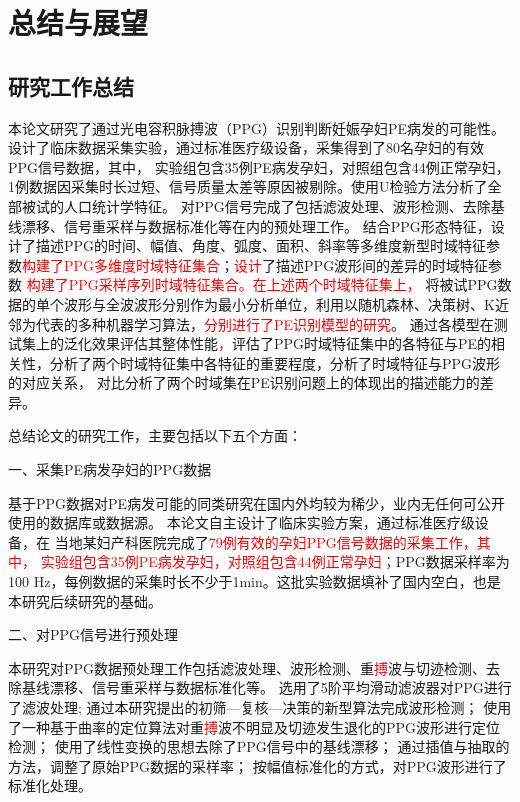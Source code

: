 \chapter{总结与展望}
\section{研究工作总结}
本论文研究了通过光电容积脉搏波（PPG）识别判断妊娠孕妇PE病发的可能性。设计了临床数据采集实验，通过标准医疗级设备，采集得到了80名孕妇的有效PPG信号数据，其中，
实验组包含35例PE病发孕妇，对照组包含44例正常孕妇，1例数据因采集时长过短、信号质量太差等原因被剔除。使用U检验方法分析了全部被试的人口统计学特征。
对PPG信号完成了包括滤波处理、波形检测、去除基线漂移、信号重采样与数据标准化等在内的预处理工作。
结合PPG形态特征，设计了描述PPG的时间、幅值、角度、弧度、面积、斜率等多维度新型时域特征参数\textcolor{red}{构建了PPG多维度时域特征集合}；\textcolor{red}{设计}了描述PPG波形间的差异的时域特征参数
\textcolor{red}{构建了PPG采样序列时域特征集合。在上述两个时域特征集上，}
将被试PPG数据的单个波形与全波波形分别作为最小分析单位，利用以随机森林、决策树、K近邻为代表的多种机器学习算法，\textcolor{red}{分别进行了PE识别模型的研究}。
通过各模型在测试集上的泛化效果评估其整体性能\textcolor{red}{，}评估了PPG时域特征集中的各特征与PE的相关性，分析了两个时域特征集中各特征的重要程度，分析了时域特征与PPG波形的对应关系，
对比分析了两个时域集在PE识别问题上的体现出的描述能力的差异。

总结论文的研究工作，主要包括以下五个方面：

一、采集PE病发孕妇的PPG数据

基于PPG数据对PE病发可能的同类研究在国内外均较为稀少，业内无任何可公开使用的数据库或数据源。
本论文自主设计了临床实验方案，通过标准医疗级设备，在%
当地某妇产科医院完成了\textcolor{red}{79例有效的孕妇PPG信号数据的采集工作，其中，
实验组包含35例PE病发孕妇，对照组包含44例正常孕妇；}PPG数据采样率为100 Hz，每例数据的采集时长不少于1min。这批实验数据填补了国内空白，也是本研究后续研究的基础。

二、对PPG信号进行预处理

本研究对PPG数据预处理工作包括滤波处理、波形检测、重\textcolor{red}{搏}波与切迹检测、去除基线漂移、信号重采样与数据标准化等。
选用了5阶平均滑动滤波器对PPG进行了滤波处理;
通过本研究提出的初筛—复核—决策的新型算法完成波形检测；
使用了一种基于曲率的定位算法对重\textcolor{red}{搏}波不明显及切迹发生退化的PPG波形进行定位检测；
使用了线性变换的思想去除了PPG信号中的基线漂移；
通过插值与抽取的方法，调整了原始PPG数据的采样率；
按幅值标准化的方式，对PPG波形进行了标准化处理。

